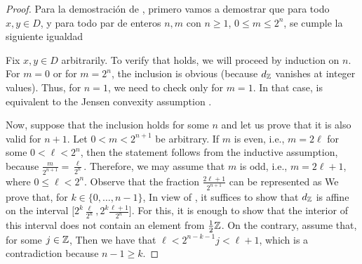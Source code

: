 \begin{proof} 
	Para la demostraci\'on de , primero vamos a demostrar que
	para todo $x,y\in D$, y para todo par de enteros $n,m$ con 
	$n\geq 1$, $0\leq m\leq 2^n$, se cumple la siguiente igualdad
	
Fix $x,y\in D$ arbitrarily. To verify that  holds, we will proceed by induction on $n$. 
For $m=0$ or for $m=2^n$, the inclusion  is obvious (because $d_{\mathbb{Z}}$ vanishes at integer
values). Thus, for $n=1$, we need to check  only for $m=1$. In that case,  is
equivalent to the Jensen convexity assumption .

Now, suppose that the inclusion  holds for some $n$ and let us prove that it is also valid for
$n+1$. Let $0<m<2^{n+1}$ be arbitrary. If $m$ is even, i.e., $m=2\ell$ for some $0<\ell<2^n$, then
the statement follows from the inductive assumption, because $\frac{m}{2^{n+1}}=\frac{\ell}{2^n}$.
Therefore, we may assume that $m$ is odd, i.e., $m=2\ell+1$, where $0\leq \ell<2^n$.
Observe that the fraction $\frac{2\ell+1}{2^{n+1}}$ can be represented as
We prove that, for $k\in\{0,\dots,n-1\}$,
In view of , it suffices to show that $d_{\mathbb{Z}}$ is affine on the interval 
$\Big[2^k\frac{\ell}{2^{n}},2^k\frac{\ell+1}{2^{n}}\Big]$. For this, it is enough to show
that the interior of this interval does not contain an element from $\frac12\mathbb{Z}$. On the contrary,
assume that, for some $j\in\mathbb{Z}$,
Then we have that $\ell<2^{n-k-1}j<\ell+1$, which is a contradiction because $n-1\geq k$. 


\end{proof}
